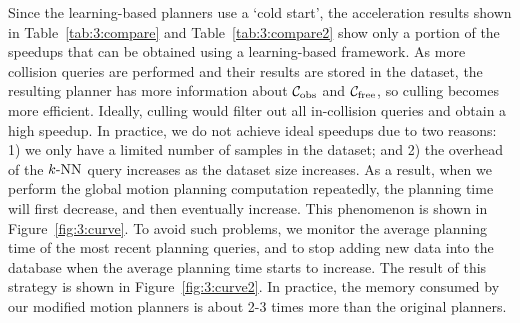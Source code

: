 Since the learning-based planners use a `cold start', the acceleration results shown in Table~\ref{tab:3:compare} and Table~\ref{tab:3:compare2} show only a portion of the speedups that can be obtained using a learning-based framework. 
As more collision queries are performed and their results are stored in the dataset, the resulting planner has more information about $\mathcal C_{\text{obs}}$ and $\mathcal C_{\text{free}}$, so culling becomes more efficient. Ideally, culling would filter out all in-collision queries and obtain a high speedup. In practice, we do not achieve ideal speedups due to two reasons: 1) we only have a limited number of samples in the dataset; and 2) the overhead of the $k\text{-NN}$ query increases as the dataset size increases. As a result, when we perform the global motion planning computation repeatedly, the planning time will first decrease, and then eventually increase. This phenomenon is shown in Figure~\ref{fig:3:curve}. To avoid such problems, we monitor the average planning time of the most recent planning queries, and to stop adding new data into the database when the average planning time starts to increase. The result of this strategy is shown in Figure~\ref{fig:3:curve2}. In practice, the memory consumed by our modified motion planners is about 2-3 times more than the original planners.

